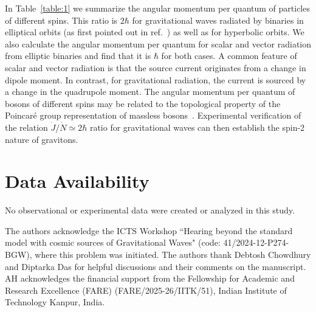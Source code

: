 \documentclass[aps,prd]{revtex4-2}
\begin{document}
In Table~\ref{table:1} we summarize the angular momentum per quantum of particles of different spins. This ratio is $2\hbar$ for gravitational waves radiated by binaries in elliptical orbits (as first pointed out in ref.~\cite{Page:2025ncu}) as well as for hyperbolic orbits. We also calculate the angular momentum per quantum for scalar and vector radiation from elliptic binaries and find that it is $\hbar$ for both cases. A common feature of scalar and vector radiation is that the source current originates from a change in dipole moment. In contrast, for gravitational radiation, the current is sourced by a change in the quadrupole moment. The angular momentum per quantum of bosons of different spins may be related to the topological property of the Poincaré group representation of massless bosons~\cite{Palmerduca:2023ctx, Palmerduca:2024msq}. Experimental verification of the relation $\dot {J}/\dot{N} \simeq 2 \hbar$ ratio for gravitational waves can then establish the spin-2 nature of gravitons. 

\section{Data Availability}
No observational or experimental data were created or analyzed in this study.




\begin{acknowledgments}
The authors acknowledge the ICTS Workshop ``Hearing beyond the standard model with cosmic sources of Gravitational Waves" (code: 41/2024-12-P274-BGW), where this problem was initiated. The authors thank Debtosh Chowdhury and Diptarka Das for helpful discussions and their comments on the manuscript. AH acknowledges the financial support from the Fellowship for Academic and Research Excellence (FARE) (FARE/2025-26/IITK/51), Indian Institute of Technology Kanpur, India.
\end{acknowledgments}




\end{document}
